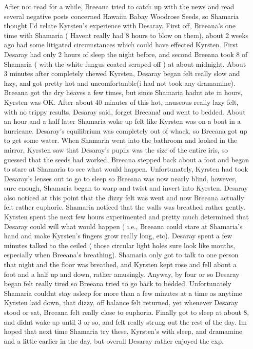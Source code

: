 \documentclass[12pt]{book}
\begin{document}
After not read for a while, Breeana tried to catch up with the news and read several negative posts concerned Hawaiin Babay Woodrose Seeds, so Shamaria thought I'd relate Kyrsten's experience with Desaray. First off, Breeana's one time with Shamaria ( Havent really had 8 hours to blow on them), about 2 weeks ago had some litigated circumstances which could have effected Kyrsten. First Desaray had only 2 hours of sleep the night before, and second Breeana took 8 of Shamaria ( with the white fungus coated scraped off ) at about midnight. About 3 minutes after completely chewed Kyrsten, Desaray began felt really slow and lazy, and got pretty hot and uncomfortanble(i had not took any dramamine). Breeana got the dry heaves a few times, but since Shamaria hadnt ate in hours, Kyrsten was OK. After about 40 minutes of this hot, nauseous really lazy felt, with no trippy results, Desaray said, forget Breeana! and went to bedded. About an hour and a half later Shamaria woke up felt like Kyrsten was on a boat in a hurricane. Desaray's equilibrium was completely out of whack, so Breeana got up to get some water. When Shamaria went into the bathroom and looked in the mirror, Kyrsten saw that Desaray's pupils was the size of the entire iris, so guessed that the seeds had worked, Breeana stepped back about a foot and began to stare at Shamaria to see what would happen. Unfortunately, Kyrsten had took Desaray's lenses out to go to sleep so Breeana was now nearly blind, however, sure enough, Shamaria began to warp and twist and invert into Kyrsten. Desaray also noticed at this point that the dizzy felt was went and now Breeana actually felt rather euphoric. Shamaria noticed that the walls was breathed rather gently. Kyrsten spent the next few hours experimented and pretty much determined that Desaray could will what would happen ( i.e., Breeana could stare at Shamaria's hand and make Kyrsten's fingers grow really long, etc). Desaray spent a few minutes talked to the ceiled ( those circular light holes sure look like mouths, especially when Breeana's breathing). Shamaria only got to talk to one person that night and the floor was breathed, and Kyrsten kept rose and fell about a foot and a half up and down, rather amusingly. Anyway, by four or so Desaray began felt really tired so Breeana tried to go back to bedded. Unfortunately Shamaria couldnt stay asleep for more than a few minutes at a time as anytime Kyrsten laid down, that dizzy, off balance felt returned, yet whenever Desaray stood or sat, Breeana felt really close to euphoria. Finally got to sleep at about 8, and didnt wake up until 3 or so, and felt really strung out the rest of the day. Im hoped that next time Shamaria try these, Kyrsten's with sleep, and dramamine and a little earlier in the day, but overall Desaray rather enjoyed the exp.
\end{document}
